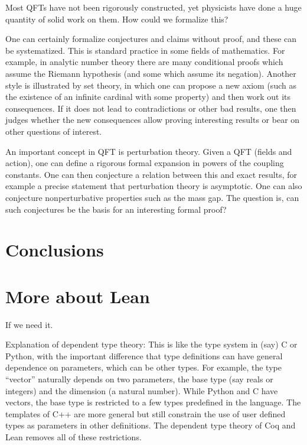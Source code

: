 \documentclass{article}
\begin{document}
Most QFTs have not been rigorously constructed, yet physicists have done a huge quantity of solid work on them.  How could we formalize this?

One can certainly formalize conjectures and claims without proof, and these can be systematized.  
This is standard practice in some fields of mathematics.  For example, in analytic number theory there are many conditional proofs which
assume the Riemann hypothesis (and some which assume its negation).  Another style is illustrated by set theory, 
in which one can propose a new axiom (such as the existence of an infinite cardinal with some property) and then work out its
consequences.  If it does not lead to contradictions or other bad results, one then judges whether the new consequences allow
proving interesting results or bear on other questions of interest. 

An important concept in QFT is perturbation theory.  Given a QFT (fields and action), one can define a rigorous formal expansion
in powers of the coupling constants.  One can then conjecture a relation between this and exact results, for example a precise statement
that perturbation theory is asymptotic.  One can also conjecture nonperturbative properties such as the mass gap.  The question is, can such
conjectures be the basis for an interesting formal proof?

\section{Conclusions}

\appendix

\section{More about Lean}

If we need it.

Explanation of dependent type theory:
This is like the type system in (say) C or Python, with the important difference that type definitions can have
general dependence on parameters, which can be other types.  
For example, the type ``vector'' naturally depends on two parameters, the base
type (say reals or integers) and the dimension (a natural number).  While Python and C have vectors, the base type
is restricted to a few types predefined in the language.  The templates of C++ are more general but still constrain
the use of user defined types as parameters in other definitions.  The dependent type theory of Coq and Lean
removes all of these restrictions.
\end{document}
